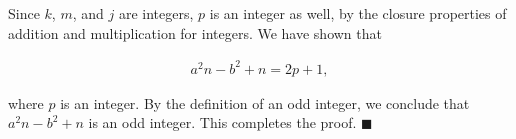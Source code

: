\documentclass[10pt]{exam}
\begin{document}
\begin{questions}
\begin{solution}
Since $k$, $m$, and $j$ are integers, $p$ is an integer as well, by the closure properties of addition and multiplication for integers. We have shown that

\begin{align*}
a^2n - b^2 + n = 2p + 1,
\end{align*}

where $p$ is an integer. By the definition of an odd integer, we conclude that $a^2n - b^2 + n$ is an odd integer. This completes the proof. $\blacksquare$
\end{solution}

\end{questions}
\end{document}
